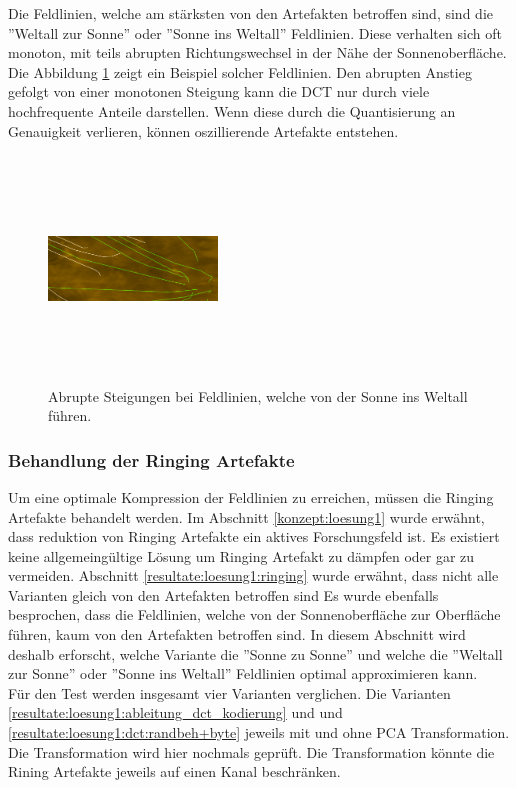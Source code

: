 Die Feldlinien, welche am stärksten von den Artefakten betroffen sind, sind die ''Weltall zur Sonne'' oder ''Sonne ins Weltall'' Feldlinien. Diese verhalten sich oft monoton, mit teils abrupten Richtungswechsel in der Nähe der Sonnenoberfläche. Die Abbildung \ref{resultate:loesung1:dct:randbehandlung:harte_richtungswechsel} zeigt ein Beispiel solcher Feldlinien. Den abrupten Anstieg gefolgt von einer monotonen Steigung kann die DCT nur durch viele hochfrequente Anteile darstellen. Wenn diese durch die Quantisierung an Genauigkeit verlieren, können oszillierende Artefakte entstehen. 
\begin{figure}
\center
\includegraphics[width=0.4\textwidth,height=6cm,keepaspectratio]{./pictures/resultate/loesung1/ringing/haar-like.png}
	\caption{Abrupte Steigungen bei Feldlinien, welche von der Sonne ins Weltall führen.}
	\label{resultate:loesung1:dct:randbehandlung:harte_richtungswechsel}
\end{figure}

\subsubsection{Behandlung der Ringing Artefakte} \label{resultate:loesung1:behandlung_ringing}
Um eine optimale Kompression der Feldlinien zu erreichen, müssen die Ringing Artefakte behandelt werden. Im Abschnitt \ref{konzept:loesung1} wurde erwähnt, dass reduktion von Ringing Artefakte ein aktives Forschungsfeld ist. Es existiert keine allgemeingültige Lösung um Ringing Artefakt zu dämpfen oder gar zu vermeiden. Abschnitt \ref{resultate:loesung1:ringing} wurde erwähnt, dass nicht alle Varianten gleich von den Artefakten betroffen sind Es wurde ebenfalls besprochen, dass die Feldlinien, welche von der Sonnenoberfläche zur Oberfläche führen, kaum von den Artefakten betroffen sind. In diesem Abschnitt wird deshalb erforscht, welche Variante die ''Sonne zu Sonne'' und welche die ''Weltall zur Sonne'' oder ''Sonne ins Weltall'' Feldlinien optimal approximieren kann.\\
Für den Test werden insgesamt vier Varianten verglichen. Die Varianten \ref{resultate:loesung1:ableitung_dct_kodierung} und und \ref{resultate:loesung1:dct:randbeh+byte} jeweils mit und ohne PCA Transformation. Die Transformation wird hier nochmals geprüft. Die Transformation könnte die Rining Artefakte jeweils auf einen Kanal beschränken.\\

